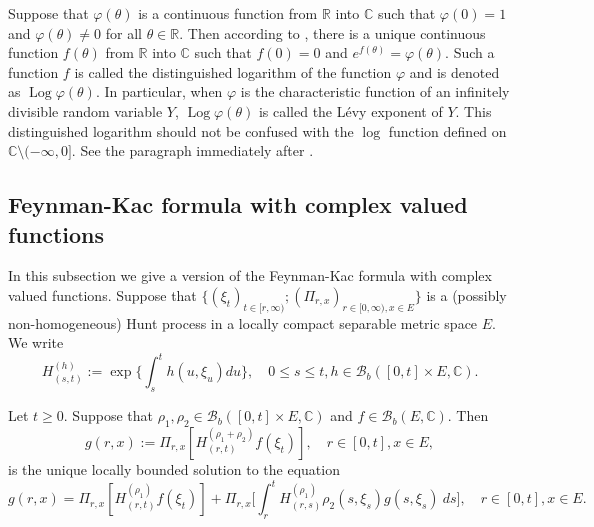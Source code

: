 \documentclass[EJP]{ejpecp} %
\begin{document}
	Suppose that $\varphi(\theta)$ is a continuous function from $\mathbb R$ into $\mathbb C$ such that $\varphi(0) = 1$ and $\varphi(\theta) \neq 0$ for all $\theta \in \mathbb R$.
	Then according to \cite[Lemma 7.6]{Sato2013Levy}, there is a unique continuous function $f(\theta)$ from $\mathbb R$ into $\mathbb C$ such that $f(0) = 0$ and $e^{f(\theta)} = \varphi(\theta)$.
	Such a function $f$ is called the distinguished logarithm of the function $\varphi$ and is denoted as $\operatorname{Log} \varphi(\theta)$.
	In particular, when $\varphi$ is the characteristic function of an infinitely divisible random variable $Y$,  $\operatorname{Log} \varphi(\theta)$ is called the L\'evy exponent of $Y$.
	This distinguished logarithm should not be confused with the $\log$ function defined on $\mathbb C\setminus (-\infty, 0]$.
	See the paragraph immediately after \cite[Lemma 7.6]{Sato2013Levy}.

\subsection{Feynman-Kac formula with complex valued functions}
\label{seq: complex Feynman-Kac transform}
	In this subsection we give a version of the Feynman-Kac formula with complex valued functions.
	Suppose that $\{(\xi_t)_{t \in [r,\infty)}; (\Pi_{r,x})_{r\in [0,\infty), x\in E}\}$ is a (possibly non-homogeneous) Hunt process in a locally compact separable metric space $E$.
	We write
\[
 	H^{(h)}_{(s,t)}
 	:= \exp\Big\{\int_s^t h(u,\xi_u) du\Big\},
 	\quad 0 \leq s \leq t, h \in \mathcal B_b([0,t] \times E,\mathbb C).
\]

\begin{lemma}
\label{eq: complex FK}
	Let $t \geq 0$. Suppose that $\rho_1, \rho_2\in \mathcal B_b([0,t] \times E, \mathbb C)$ and $f\in \mathcal B_b(E, \mathbb C)$.
	Then
\begin{equation}
\label{eq: expresion of g}
    g(r,x)
    := \Pi_{r,x}[ H_{(r,t)}^{(\rho_1+\rho_2)} f(\xi_t)],\quad r \in [0,t], x\in E,
\end{equation}
	is the unique locally bounded solution to the equation
\[
    g(r,x)
    = \Pi_{r,x} [ H_{(r,t)}^{(\rho_1)} f(\xi_t)]+\Pi_{r,x} \Big[ \int_r^tH_{(r,s)}^{(\rho_1)}\rho_2(s,\xi_s) g(s,\xi_s)~ds \Big],\quad r \in [0,t], x\in E.
\]
\end{lemma}
\end{document}
